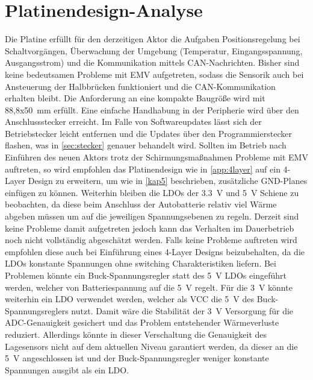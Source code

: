\section{Platinendesign-Analyse}\label{sec:platan}
Die Platine erfüllt für den derzeitigen Aktor die Aufgaben Positionsregelung bei Schaltvorgängen, Überwachung der Umgebung (Temperatur, Eingangsspannung, Ausgangsstrom) und die Kommunikation mittels CAN-Nachrichten. Bisher sind keine bedeutsamen Probleme mit EMV aufgetreten, sodass die Sensorik auch bei Ansteuerung der Halbbrücken funktioniert und die CAN-Kommunikation erhalten bleibt. Die Anforderung an eine kompakte Baugröße wird mit 88,8x\SI{50}{mm} erfüllt. Eine einfache Handhabung in der Peripherie wird über den Anschlussstecker erreicht. Im Falle von Softwareupdates lässt sich der Betriebstecker leicht entfernen und die Updates über den Programmierstecker flashen, was in \autoref{sec:stecker} genauer behandelt wird. Sollten im Betrieb nach Einführen des neuen Aktors trotz der Schirmungsmaßnahmen Probleme mit EMV auftreten, so wird empfohlen das Platinendesign wie in \autoref{app:4layer} auf ein 4-Layer Design zu erweitern, um wie in \autoref{kap5} beschrieben, zusätzliche GND-Planes einfügen zu können. Weiterhin bleiben die LDOs der \SI{3,3}{V} und \SI{5}{V} Schiene zu beobachten, da diese beim Anschluss der Autobatterie relativ viel Wärme abgeben müssen um auf die jeweiligen Spannungsebenen zu regeln. Derzeit sind keine Probleme damit aufgetreten jedoch kann das Verhalten im Dauerbetrieb noch nicht vollständig abgeschätzt werden. Falls keine Probleme auftreten wird empfohlen diese auch bei Einführung eines 4-Layer Designs beizubehalten, da die LDOs konstante Spannungen ohne switching Charakteristiken liefern. Bei Problemen könnte ein Buck-Spannungsregler statt des \SI{5}{V} LDOs eingeführt werden, welcher von Batteriespannung auf die \SI{5}{V} regelt. Für die \SI{3}{V} könnte weiterhin ein LDO verwendet werden, welcher als VCC die \SI{5}{V} des Buck-Spannungsreglers nutzt. Damit wäre die Stabilität der \SI{3}{V} Versorgung für die ADC-Genauigkeit gesichert und das Problem entstehender Wärmeverluste reduziert. Allerdings könnte in dieser Verschaltung die Genauigkeit des Lagesensors nicht auf dem aktuellen Niveau garantiert werden, da dieser an die \SI{5}{V} angeschlossen ist und der Buck-Spannungsregler weniger konstante Spannungen ausgibt als ein LDO. 


